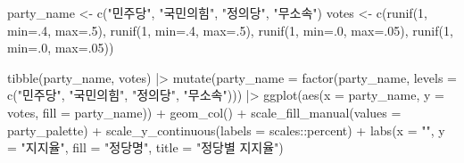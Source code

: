 \documentclass[
  letterpaper,
]{book}
\newenvironment{Shaded}{\begin{snugshade}}{\end{snugshade}}
\newcommand{\AttributeTok}[1]{\textcolor[rgb]{0.40,0.45,0.13}{#1}}
\newcommand{\DecValTok}[1]{\textcolor[rgb]{0.68,0.00,0.00}{#1}}
\newcommand{\FunctionTok}[1]{\textcolor[rgb]{0.28,0.35,0.67}{#1}}
\newcommand{\NormalTok}[1]{\textcolor[rgb]{0.00,0.23,0.31}{#1}}
\newcommand{\OtherTok}[1]{\textcolor[rgb]{0.00,0.23,0.31}{#1}}
\newcommand{\SpecialCharTok}[1]{\textcolor[rgb]{0.37,0.37,0.37}{#1}}
\newcommand{\StringTok}[1]{\textcolor[rgb]{0.13,0.47,0.30}{#1}}
\begin{document}
\begin{Shaded}
\begin{Highlighting}[]
\NormalTok{party\_name }\OtherTok{\textless{}{-}} \FunctionTok{c}\NormalTok{(}\StringTok{"민주당"}\NormalTok{, }\StringTok{"국민의힘"}\NormalTok{, }\StringTok{"정의당"}\NormalTok{, }\StringTok{"무소속"}\NormalTok{)}
\NormalTok{votes }\OtherTok{\textless{}{-}} \FunctionTok{c}\NormalTok{(}\FunctionTok{runif}\NormalTok{(}\DecValTok{1}\NormalTok{, }\AttributeTok{min=}\NormalTok{.}\DecValTok{4}\NormalTok{, }\AttributeTok{max=}\NormalTok{.}\DecValTok{5}\NormalTok{),}
           \FunctionTok{runif}\NormalTok{(}\DecValTok{1}\NormalTok{, }\AttributeTok{min=}\NormalTok{.}\DecValTok{4}\NormalTok{, }\AttributeTok{max=}\NormalTok{.}\DecValTok{5}\NormalTok{),}
           \FunctionTok{runif}\NormalTok{(}\DecValTok{1}\NormalTok{, }\AttributeTok{min=}\NormalTok{.}\DecValTok{0}\NormalTok{, }\AttributeTok{max=}\NormalTok{.}\DecValTok{05}\NormalTok{),}
           \FunctionTok{runif}\NormalTok{(}\DecValTok{1}\NormalTok{, }\AttributeTok{min=}\NormalTok{.}\DecValTok{0}\NormalTok{, }\AttributeTok{max=}\NormalTok{.}\DecValTok{05}\NormalTok{))}

\FunctionTok{tibble}\NormalTok{(party\_name, votes) }\SpecialCharTok{|\textgreater{}} 
  \FunctionTok{mutate}\NormalTok{(}\AttributeTok{party\_name =} \FunctionTok{factor}\NormalTok{(party\_name, }\AttributeTok{levels =} \FunctionTok{c}\NormalTok{(}\StringTok{"민주당"}\NormalTok{, }\StringTok{"국민의힘"}\NormalTok{, }\StringTok{"정의당"}\NormalTok{, }\StringTok{"무소속"}\NormalTok{))) }\SpecialCharTok{|\textgreater{}} 
  \FunctionTok{ggplot}\NormalTok{(}\FunctionTok{aes}\NormalTok{(}\AttributeTok{x =}\NormalTok{ party\_name, }\AttributeTok{y =}\NormalTok{ votes, }\AttributeTok{fill =}\NormalTok{ party\_name)) }\SpecialCharTok{+}
    \FunctionTok{geom\_col}\NormalTok{() }\SpecialCharTok{+}
    \FunctionTok{scale\_fill\_manual}\NormalTok{(}\AttributeTok{values =}\NormalTok{ party\_palette) }\SpecialCharTok{+}
    \FunctionTok{scale\_y\_continuous}\NormalTok{(}\AttributeTok{labels =}\NormalTok{ scales}\SpecialCharTok{::}\NormalTok{percent) }\SpecialCharTok{+}
    \FunctionTok{labs}\NormalTok{(}\AttributeTok{x =} \StringTok{""}\NormalTok{,}
         \AttributeTok{y =} \StringTok{"지지율"}\NormalTok{,}
         \AttributeTok{fill =} \StringTok{"정당명"}\NormalTok{,}
         \AttributeTok{title =} \StringTok{"정당별 지지율"}\NormalTok{) }
\end{Highlighting}
\end{Shaded}
\end{document}
